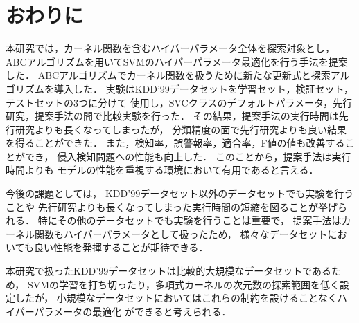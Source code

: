 \section{おわりに}
本研究では，カーネル関数を含むハイパーパラメータ全体を探索対象とし，
ABCアルゴリズムを用いてSVMのハイパーパラメータ最適化を行う手法を提案した．
ABCアルゴリズムでカーネル関数を扱うために新たな更新式と探索アルゴリズムを導入した．
実験はKDD'99データセットを学習セット，検証セット，テストセットの3つに分けて
使用し，SVCクラスのデフォルトパラメータ，先行研究，提案手法の間で比較実験を行った．
その結果，提案手法の実行時間は先行研究よりも長くなってしまったが，
分類精度の面で先行研究よりも良い結果を得ることができた．
また，検知率，誤警報率，適合率，F値の値も改善することができ，
侵入検知問題への性能も向上した．
このことから，提案手法は実行時間よりも
モデルの性能を重視する環境において有用であると言える．

今後の課題としては， KDD'99データセット以外のデータセットでも実験を行うことや
先行研究よりも長くなってしまった実行時間の短縮を図ることが挙げられる．
特にその他のデータセットでも実験を行うことは重要で，
提案手法はカーネル関数もハイパーパラメータとして扱ったため，
様々なデータセットにおいても良い性能を発揮することが期待できる．

本研究で扱ったKDD'99データセットは比較的大規模なデータセットであるため，
SVMの学習を打ち切ったり，多項式カーネルの次元数の探索範囲を低く設定したが，
小規模なデータセットにおいてはこれらの制約を設けることなくハイパーパラメータの最適化
ができると考えられる．





